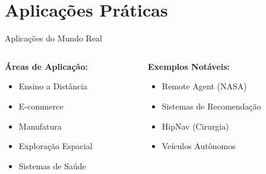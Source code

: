 \documentclass[aspectratio=169,xcolor=table]{beamer}
\begin{document}
\section{Aplicações Práticas}
\begin{frame}{Aplicações do Mundo Real}
    \begin{columns}[t]
        \begin{column}{0.38\textwidth}
            \textbf{Áreas de Aplicação:}
            \begin{itemize}
                \item Ensino a Distância
                \item E-commerce
                \item Manufatura
                \item Exploração Espacial
                \item Sistemas de Saúde
            \end{itemize}
        \end{column}
        \begin{column}{0.38\textwidth}
            \textbf{Exemplos Notáveis:}
            \begin{itemize}
                \item Remote Agent (NASA)
                \item Sistemas de Recomendação
                \item HipNav (Cirurgia)
                \item Veículos Autônomos
            \end{itemize}
        \end{column}
    \end{columns}
\end{frame}

\end{document}
